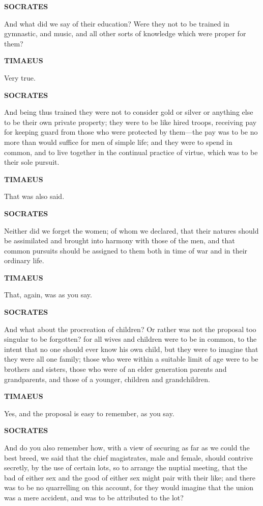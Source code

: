\documentclass[11pt,letter]{article}
\begin{document}
\par \textbf{SOCRATES}
\par   And what did we say of their education? Were they not to be trained in gymnastic, and music, and all other sorts of knowledge which were proper for them?

\par \textbf{TIMAEUS}
\par   Very true.

\par \textbf{SOCRATES}
\par   And being thus trained they were not to consider gold or silver or anything else to be their own private property; they were to be like hired troops, receiving pay for keeping guard from those who were protected by them—the pay was to be no more than would suffice for men of simple life; and they were to spend in common, and to live together in the continual practice of virtue, which was to be their sole pursuit.

\par \textbf{TIMAEUS}
\par   That was also said.

\par \textbf{SOCRATES}
\par   Neither did we forget the women; of whom we declared, that their natures should be assimilated and brought into harmony with those of the men, and that common pursuits should be assigned to them both in time of war and in their ordinary life.

\par \textbf{TIMAEUS}
\par   That, again, was as you say.

\par \textbf{SOCRATES}
\par   And what about the procreation of children? Or rather was not the proposal too singular to be forgotten? for all wives and children were to be in common, to the intent that no one should ever know his own child, but they were to imagine that they were all one family; those who were within a suitable limit of age were to be brothers and sisters, those who were of an elder generation parents and grandparents, and those of a younger, children and grandchildren.

\par \textbf{TIMAEUS}
\par   Yes, and the proposal is easy to remember, as you say.

\par \textbf{SOCRATES}
\par   And do you also remember how, with a view of securing as far as we could the best breed, we said that the chief magistrates, male and female, should contrive secretly, by the use of certain lots, so to arrange the nuptial meeting, that the bad of either sex and the good of either sex might pair with their like; and there was to be no quarrelling on this account, for they would imagine that the union was a mere accident, and was to be attributed to the lot?
\end{document}
